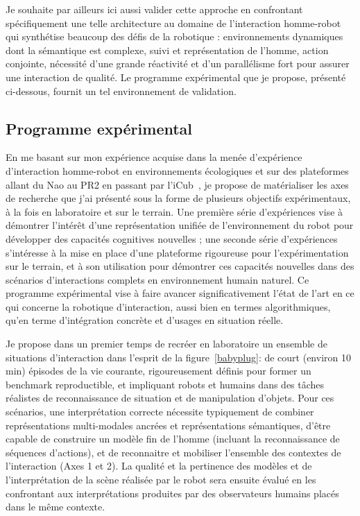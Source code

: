 \documentclass[a4paper]{article}
\begin{document}
Je souhaite par ailleurs ici aussi valider cette approche en confrontant
spécifiquement une telle architecture au domaine de l'interaction homme-robot
qui synthétise beaucoup des défis de la robotique : environnements dynamiques
dont la sémantique est complexe, suivi et représentation de l'homme, action
conjointe, nécessité d'une grande réactivité et d'un parallélisme fort pour
assurer une interaction de qualité. Le programme expérimental que je propose,
présenté ci-dessous, fournit un tel environnement de validation.

\subsection*{Programme expérimental}

En me basant sur mon expérience acquise dans la menée d'expérience d'interaction
homme-robot en environnements écologiques et sur des plateformes allant du Nao
au PR2 en passant par
l'iCub~\cite{lemaignan2010oro,ros2010which,lallee2011towards,lemaignan2012roboscopie,warnier2012when,hood2015when},
je propose de matérialiser les axes de recherche que j'ai présenté sous la forme
de plusieurs objectifs expérimentaux, à la fois en laboratoire et sur le
terrain.  Une première série d'expériences vise à démontrer l'intérêt d'une
représentation unifiée de l'environnement du robot pour développer des capacités
cognitives nouvelles ; une seconde série d'expériences s'intéresse à la mise en
place d'une plateforme rigoureuse pour l'expérimentation sur le terrain, et à
son utilisation pour démontrer ces capacités nouvelles dans des scénarios
d'interactions complets en environnement humain naturel. Ce programme
expérimental vise à faire avancer significativement l'état de l'art en ce qui
concerne la robotique d'interaction, aussi bien en termes algorithmiques, qu'en
terme d'intégration concrète et d'usages en situation réelle.

Je propose dans un premier temps de recréer en laboratoire un ensemble de
situations d'interaction dans l'esprit de la figure~\ref{babyplug}: de court
(environ 10 min) épisodes de la vie courante, rigoureusement définis pour former
un benchmark reproductible, et impliquant robots et humains dans des tâches
réalistes de reconnaissance de situation et de manipulation d'objets. Pour ces
scénarios, une interprétation correcte nécessite typiquement de combiner
représentations multi-modales ancrées et représentations sémantiques, d'être
capable de construire un modèle fin de l'homme (incluant la reconnaissance de
séquences d'actions), et de reconnaitre et mobiliser l'ensemble des contextes de
l'interaction (Axes 1 et 2). La qualité et la pertinence des modèles et de
l'interprétation de la scène réalisée par le robot sera ensuite évalué en les
confrontant aux interprétations produites par des observateurs humains placés
dans le même contexte.
\end{document}
